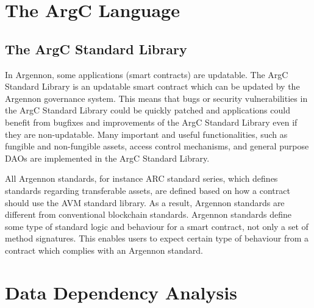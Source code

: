 \section{The ArgC Language}\label{sec:the-argc-language}

\subsection{The ArgC Standard Library}\label{sec:asl}

In Argennon, some applications (smart contracts) are updatable. The ArgC Standard Library is an updatable smart
contract which can be updated by the Argennon governance
system. This means that bugs or security vulnerabilities in the ArgC Standard Library could be quickly patched and
applications could benefit from bugfixes and improvements of the ArgC Standard Library even if they are
non-updatable. Many important and useful functionalities,
such as fungible and non-fungible assets, access control mechanisms,
and general purpose DAOs are implemented in the ArgC Standard Library.

All Argennon standards, for instance ARC standard series, which defines standards regarding transferable assets,
are defined based on how a contract should use the AVM standard library. As a result, Argennon standards are
different from conventional blockchain standards. Argennon standards define some type of standard logic and
behaviour for a smart contract, not only a set of method signatures. This enables users to expect certain type
of behaviour from a contract which complies with an Argennon standard.


\section{Data Dependency Analysis}\label{sec:concurrency}
